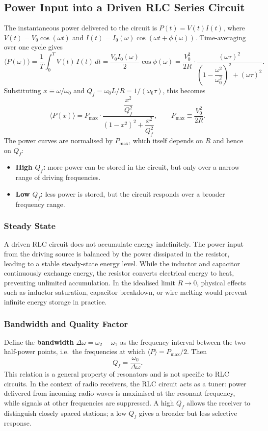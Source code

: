\documentclass{article}
\begin{document}
\subsection{Power Input into a Driven RLC Series Circuit}

The instantaneous power delivered to the circuit is $P(t) = V(t)I(t)$, where $V(t) = V_0\cos(\omega t)$ and $I(t) = I_0(\omega)\cos(\omega t + \phi(\omega))$. Time-averaging over one cycle gives
\[\langle P(\omega)\rangle = \frac{1}{T}\int_0^T V(t)\,I(t)\,dt = \frac{V_0 I_0(\omega)}{2}\cos\phi(\omega) = \frac{V_0^2}{2R}\cdot\frac{(\omega\tau)^2}{\left(1 - \dfrac{\omega^2}{\omega_0^2}\right)^2 + (\omega\tau)^2}.\]
Substituting $x \equiv \omega/\omega_0$ and $Q_f = \omega_0 L/R = 1/(\omega_0\tau)$, this becomes
\[\langle P(x)\rangle = P_{\max}\cdot\frac{\dfrac{x^2}{Q_f^2}}{\left(1 - x^2\right)^2 + \dfrac{x^2}{Q_f^2}}, \qquad P_{\max} \equiv \frac{V_0^2}{2R}.\]
The power curves are normalised by $P_{\max}$, which itself depends on $R$ and hence on $Q_f$:
\begin{itemize}
    \item \textbf{High $Q_f$:} more power can be stored in the circuit, but only over a narrow range of driving frequencies.
    \item \textbf{Low $Q_f$:} less power is stored, but the circuit responds over a broader frequency range.
\end{itemize}

\subsubsection{Steady State}
A driven RLC circuit does not accumulate energy indefinitely. The power input from the driving source is balanced by the power dissipated in the resistor, leading to a stable steady-state energy level. While the inductor and capacitor continuously exchange energy, the resistor converts electrical energy to heat, preventing unlimited accumulation. In the idealised limit $R \to 0$, physical effects such as inductor saturation, capacitor breakdown, or wire melting would prevent infinite energy storage in practice.

\subsubsection{Bandwidth and Quality Factor}
Define the \textbf{bandwidth} $\Delta\omega = \omega_2 - \omega_1$ as the frequency interval between the two half-power points, i.e.\ the frequencies at which $\langle P\rangle = P_{\max}/2$. Then
\[Q_f = \frac{\omega_0}{\Delta\omega}.\]
This relation is a general property of resonators and is not specific to RLC circuits. In the context of radio receivers, the RLC circuit acts as a tuner: power delivered from incoming radio waves is maximised at the resonant frequency, while signals at other frequencies are suppressed. A high $Q_f$ allows the receiver to distinguish closely spaced stations; a low $Q_f$ gives a broader but less selective response.
\end{document}
